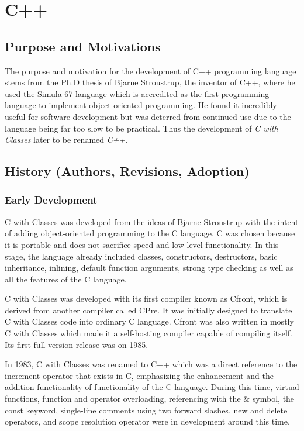 \documentclass[12pt]{article}
\begin{document}

\section{C++}
\subsection{Purpose and Motivations}
The purpose and motivation for the development of C++ programming language stems from the Ph.D thesis of Bjarne Stroustrup, the
inventor of C++, where he used the Simula 67 language which is accredited as the first programming language to implement 
object-oriented programming. He found it incredibly useful for software development but was deterred from continued use
due to the language being far too slow to be practical. Thus the development of \textit{C with Classes} later to be renamed \textit{C++}.
\subsection{History (Authors, Revisions, Adoption)}
\subsubsection{Early Development}
C with Classes was developed from the ideas of Bjarne Stroustrup with the intent of adding object-oriented programming to the C language. C was chosen because it is portable and does not sacrifice speed and low-level functionality. In this stage, the language already included classes, constructors, destructors, basic inheritance, inlining, default function arguments, strong type checking as well as all the features of the C language.

C with Classes was developed with its first compiler known as Cfront, which is derived from another compiler called CPre. It was initially designed to translate C with Classes code into ordinary C language. Cfront was also written in mostly C with Classes which made it a self-hosting compiler capable of compiling itself. Its first full version release was on 1985.

In 1983, C with Classes was renamed to C++ which was a direct reference to the increment operator that exists in C, emphasizing the enhancement and the addition functionality of functionality of the C language. During this time, virtual functions, function and operator overloading, referencing with the \& symbol, the const keyword, single-line comments using two forward slashes, new and delete operators, and scope resolution operator were in development around this time. 
\end{document}
